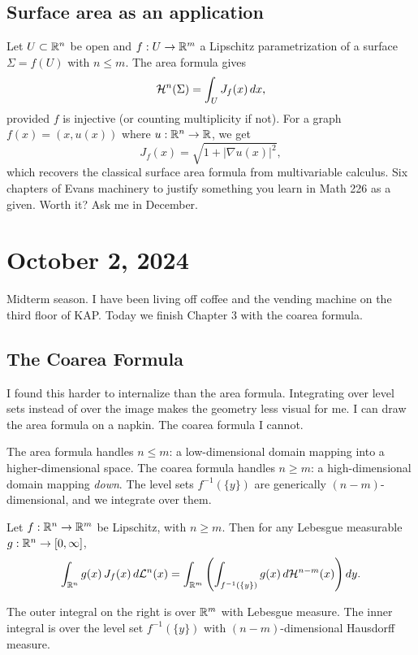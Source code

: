 \subsection{Surface area as an application}

Let $U \subset \mathbb{R}^n$ be open and $f : U \to \mathbb{R}^m$ a Lipschitz parametrization of a surface $\Sigma = f(U)$ with $n \leq m$. The area formula gives
\[
  \mathcal{H}^n(\Sigma) = \int_U J_f(x) \, dx,
\]
provided $f$ is injective (or counting multiplicity if not). For a graph $f(x) = (x, u(x))$ where $u : \mathbb{R}^n \to \mathbb{R}$, we get
\[
  J_f(x) = \sqrt{1 + |\nabla u(x)|^2},
\]
which recovers the classical surface area formula from multivariable calculus. Six chapters of Evans machinery to justify something you learn in Math 226 as a given. Worth it? Ask me in December.



\section{October 2, 2024}

Midterm season. I have been living off coffee and the vending machine on the third floor of KAP. Today we finish Chapter 3 with the coarea formula.

\subsection{The Coarea Formula}

I found this harder to internalize than the area formula. Integrating over level sets instead of over the image makes the geometry less visual for me. I can draw the area formula on a napkin. The coarea formula I cannot.

The area formula handles $n \leq m$: a low-dimensional domain mapping into a higher-dimensional space. The coarea formula handles $n \geq m$: a high-dimensional domain mapping \emph{down}. The level sets $f^{-1}(\{y\})$ are generically $(n-m)$-dimensional, and we integrate over them.

\begin{theorem}
\label{thm:coarea}
Let $f : \mathbb{R}^n \to \mathbb{R}^m$ be Lipschitz, with $n \geq m$. Then for any Lebesgue measurable $g : \mathbb{R}^n \to [0, \infty]$,
\[
  \int_{\mathbb{R}^n} g(x) \, J_f(x) \, d\mathcal{L}^n(x) = \int_{\mathbb{R}^m} \left( \int_{f^{-1}(\{y\})} g(x) \, d\mathcal{H}^{n-m}(x) \right) dy.
\]
\end{theorem}

The outer integral on the right is over $\mathbb{R}^m$ with Lebesgue measure. The inner integral is over the level set $f^{-1}(\{y\})$ with $(n-m)$-dimensional Hausdorff measure.


